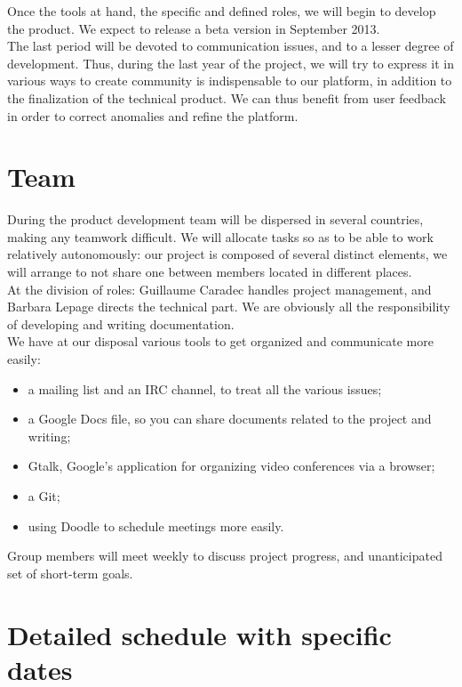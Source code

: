\documentclass{life-fr}
\begin{document}
Once the tools at hand, the specific and defined roles, we will begin to develop the product. We expect to release a beta version in September 2013.\\

The last period will be devoted to communication issues, and to a lesser degree of development. Thus, during the last year of the project, we will try to express it in various ways to create community is indispensable to our platform, in addition to the finalization of the technical product. We can thus benefit from user feedback in order to correct anomalies and refine the platform.

\newpage

\section{Team}

During the product development team will be dispersed in several countries, making any teamwork difficult. We will allocate tasks so as to be able to work relatively autonomously: our project is composed of several distinct elements, we will arrange to not share one between members located in different places.\\

At the division of roles: Guillaume Caradec handles project management, and Barbara Lepage directs the technical part. We are obviously all the responsibility of developing and writing documentation.\\

We have at our disposal various tools to get organized and communicate more easily: \\

\begin{itemize}
  \item a mailing list and an IRC channel, to treat all the various issues;
  \item a Google Docs file, so you can share documents related to the project and writing;
  \item Gtalk, Google's application for organizing video conferences via a browser;
  \item a Git;
  \item using Doodle to schedule meetings more easily.
\end{itemize}

Group members will meet weekly to discuss project progress, and unanticipated set of short-term goals.

\section{Detailed schedule with specific dates}
\end{document}
